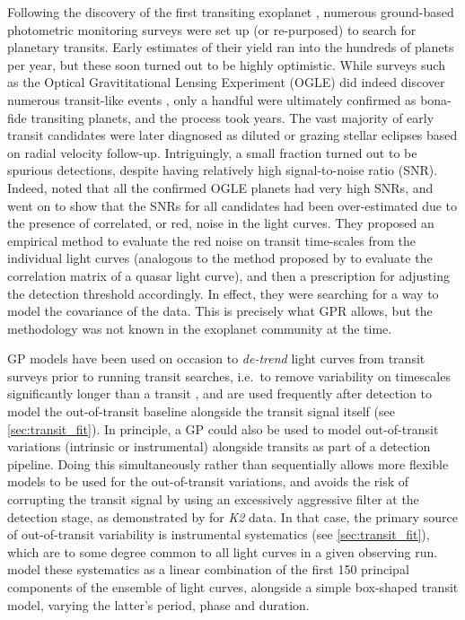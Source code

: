 \documentclass[letterpaper]{ar-1col}
\begin{document}
Following the discovery of the first transiting exoplanet \citep{2000ApJ...529L..41H,2000ApJ...529L..45C}, numerous ground-based photometric monitoring surveys were set up (or re-purposed) to search for planetary transits. Early estimates of their yield \citep[see e.g.][]{2003ASPC..294..361H} ran into the hundreds of planets per year, but these soon turned out to be highly optimistic. While surveys such as the Optical Gravititational Lensing Experiment (OGLE) did indeed discover numerous transit-like events
\citep[see e.g.][]{2002AcA....52....1U}, only a handful were ultimately confirmed as bona-fide transiting planets, and the process took years. %
The vast majority of early transit candidates were later diagnosed as diluted or grazing stellar eclipses based on radial velocity follow-up.
Intriguingly, a small fraction turned out to be spurious detections, despite having relatively high signal-to-noise ratio (SNR). Indeed, \citet{2006MNRAS.373..231P} noted that all the confirmed OGLE planets had very high SNRs, and went on to show that the SNRs for all candidates had been over-estimated due to the presence of correlated, or red, noise in the light curves. They proposed an empirical method to evaluate the red noise on transit time-scales from the individual light curves (analogous to the method proposed by \citealt{prh92a} to evaluate the correlation matrix of a quasar light curve), and then a prescription for adjusting the detection threshold accordingly. In effect, they were searching for a way to model the covariance of the data. This is precisely what GPR allows, but the methodology was not known in the exoplanet community at the time.

GP models have been used on occasion to \textit{de-trend} light curves from transit surveys prior to running transit searches, i.e.\ to remove variability on timescales significantly longer than a transit \citep[see e.g.][]{2016ApJS..226....7C}, and are used frequently after detection to model the out-of-transit baseline alongside the transit signal itself (see \autoref{sec:transit_fit}). In principle, a GP could also be used to model out-of-transit variations (intrinsic or instrumental) alongside transits as part of a detection pipeline. Doing this simultaneously rather than sequentially allows more flexible models to be used for the out-of-transit variations, and avoids the risk of corrupting the transit signal by using an excessively aggressive filter at the detection stage, as demonstrated by \citet{2015ApJ...806..215F} for \textit{K2} data. In that case, the primary source of out-of-transit variability is instrumental systematics (see \autoref{sec:transit_fit}), which are to some degree common to all light curves in a given observing run. \citet{2015ApJ...806..215F} model these systematics as a linear combination of the first 150 principal components of the ensemble of light curves, alongside a simple box-shaped transit model, varying the latter's period, phase and duration.
\end{document}
